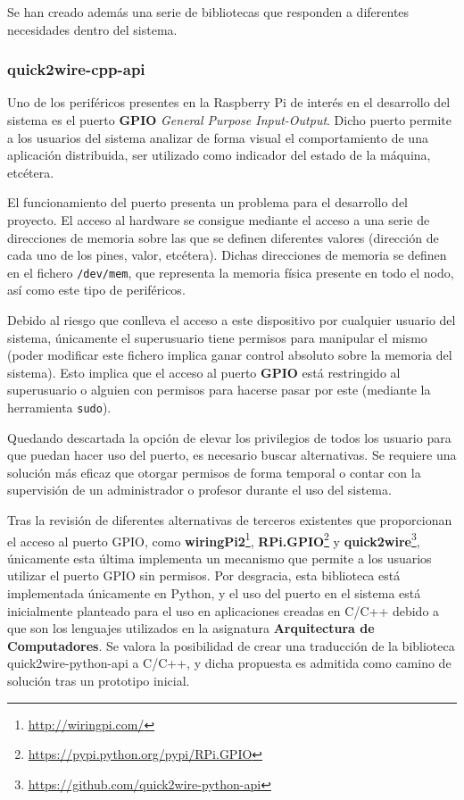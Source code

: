 Se han creado además una serie de bibliotecas que responden a diferentes necesidades dentro del sistema.

\subsubsection{quick2wire-cpp-api}

Uno de los periféricos presentes en la Raspberry Pi de interés en el desarrollo del sistema es el puerto \textbf{GPIO} \textit{General Purpose Input-Output}. Dicho puerto permite a los usuarios del sistema analizar de forma visual el comportamiento de una aplicación distribuida, ser utilizado como indicador del estado de la máquina, etcétera.

El funcionamiento del puerto presenta un problema para el desarrollo del proyecto. El acceso al hardware se consigue mediante el acceso a una serie de direcciones de memoria sobre las que se definen diferentes valores (dirección de cada uno de los pines, valor, etcétera). Dichas direcciones de memoria se definen en el fichero \texttt{/dev/mem}, que representa la memoria física presente en todo el nodo, así como este tipo de periféricos.

Debido al riesgo que conlleva el acceso a este dispositivo por cualquier usuario del sistema, únicamente el superusuario tiene permisos para manipular el mismo (poder modificar este fichero implica ganar control absoluto sobre la memoria del sistema). Esto implica que el acceso al puerto \textbf{GPIO} está restringido al superusuario o alguien con permisos para hacerse pasar por este (mediante la herramienta \texttt{sudo}).

Quedando descartada la opción de elevar los privilegios de todos los usuario para que puedan hacer uso del puerto, es necesario buscar alternativas. Se requiere una solución más eficaz que otorgar permisos de forma temporal o contar con la supervisión de un administrador o profesor durante el uso del sistema.

Tras la revisión de diferentes alternativas de terceros existentes que proporcionan el acceso al puerto GPIO, como \textbf{wiringPi2}\footnote{\href{http://wiringpi.com/}{http://wiringpi.com/}}, \textbf{RPi.GPIO}\footnote{\href{https://pypi.python.org/pypi/RPi.GPIO}{https://pypi.python.org/pypi/RPi.GPIO}} y \textbf{quick2wire}\footnote{\href{https://github.com/quick2wire-python-api}{https://github.com/quick2wire-python-api}}, únicamente esta última implementa un mecanismo que permite a los usuarios utilizar el puerto GPIO sin permisos. Por desgracia, esta biblioteca está implementada únicamente en Python, y el uso del puerto en el sistema está inicialmente planteado para el uso en aplicaciones creadas en C/C++ debido a que son los lenguajes utilizados en la asignatura \textbf{Arquitectura de Computadores}. Se valora la posibilidad de crear una traducción de la biblioteca quick2wire-python-api a C/C++, y dicha propuesta es admitida como camino de solución tras un prototipo inicial.

